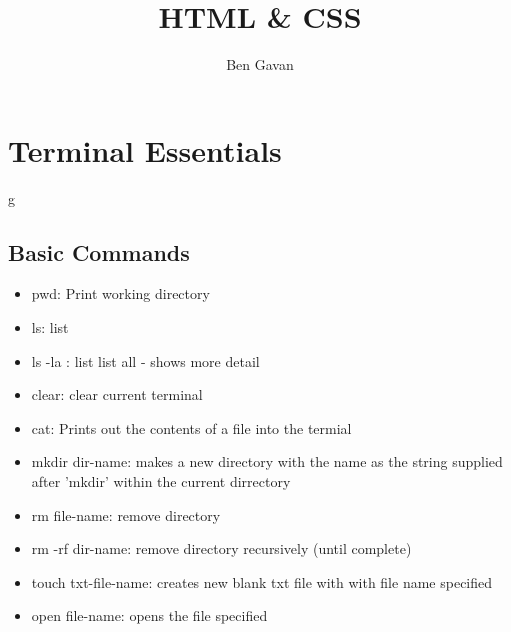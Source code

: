 \documentclass[]{article}
\title{HTML \& CSS}
\author{Ben Gavan}
\begin{document}
\maketitle

\tableofcontents

\section{Terminal Essentials}g
\subsection{Basic Commands}
\begin{itemize}
	\item pwd: Print working directory 
	\item ls: list
	\item ls -la : list list all - shows more detail 
	\item clear: clear current terminal
	\item cat: Prints out the contents of a file into the termial 
	\item mkdir dir-name: makes a new directory with the name as the string supplied after 'mkdir'  within the current dirrectory 
	\item rm file-name: remove directory 
	\item rm -rf dir-name: remove directory recursively (until complete)
	\item touch txt-file-name: creates new blank txt file with with file name specified
	\item open file-name: opens the file specified
	
\end{itemize}
\end{document}
